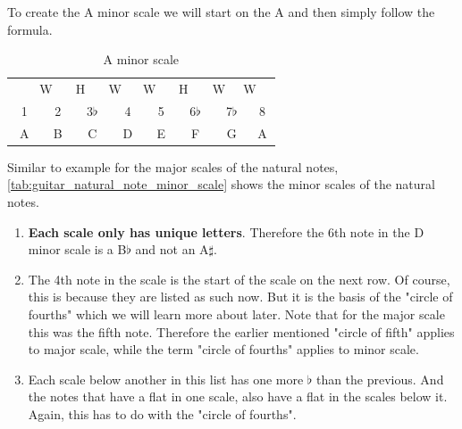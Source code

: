 To create the A minor scale we will start on the A and then simply follow the formula.

\begin{table}[h]
	\centering
	\begin{tabular}{*{16}{c}}
		& \multicolumn{2}{P{4mm}}{\large{W}} & \multicolumn{2}{P{4mm}}{\large{H}} & \multicolumn{2}{P{4mm}}{\large{W}} & \multicolumn{2}{P{4mm}}{\large{W}} & \multicolumn{2}{P{4mm}}{\large{H}} & \multicolumn{2}{P{4mm}}{\large{W}} & \multicolumn{2}{P{4mm}}{\large{W}} & \\
		\multicolumn{2}{P{4mm}}{1} & \multicolumn{2}{P{4mm}}{2} & \multicolumn{2}{P{4mm}}{3$\flat$} & \multicolumn{2}{P{4mm}}{4} & \multicolumn{2}{P{4mm}}{5} & \multicolumn{2}{P{4mm}}{6$\flat$} & \multicolumn{2}{P{4mm}}{7$\flat$} & \multicolumn{2}{P{4mm}}{8} \\
		\multicolumn{2}{P{4mm}}{A} & \multicolumn{2}{P{4mm}}{B} & \multicolumn{2}{P{4mm}}{C} & \multicolumn{2}{P{4mm}}{D} & \multicolumn{2}{P{4mm}}{E} & \multicolumn{2}{P{4mm}}{F} & \multicolumn{2}{P{4mm}}{G} & \multicolumn{2}{P{4mm}}{A}
	\end{tabular}
	\caption{A minor scale}
	\label{tab:guitar_a_minor_scale}
\end{table}

Similar to example for the major scales of the natural notes, \autoref{tab:guitar_natural_note_minor_scale} shows the minor scales of the natural notes.

\begin{enumerate}
	\item \textbf{Each scale only has unique letters}. Therefore the 6th note in the D minor scale is a B$\flat$ and not an A$\sharp$.
	\item The 4th note in the scale is the start of the scale on the next row. Of course, this is because they are listed as such now. But it is the basis of the "circle of fourths" which we will learn more about later. Note that for the major scale this was the fifth note. Therefore the earlier mentioned "circle of fifth" applies to major scale, while the term "circle of fourths" applies to minor scale.
	\item Each scale below another in this list has one more $\flat$ than the previous. And the notes that have a flat in one scale, also have a flat in the scales below it. Again, this has to do with the "circle of fourths".
\end{enumerate}

